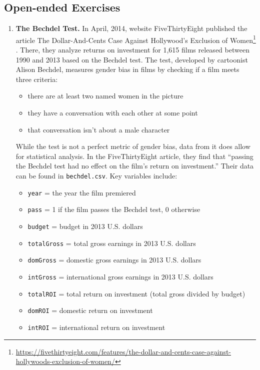 \documentclass[
]{krantz}
\providecommand{\tightlist}{%
  \setlength{\itemsep}{0pt}\setlength{\parskip}{0pt}}
\renewcommand{\href}[2]{#2\footnote{\url{#1}}}
\begin{document}
\hypertarget{open-ended-exercises}{%
\subsection{Open-ended Exercises}\label{open-ended-exercises}}

\begin{enumerate}
\def\labelenumi{\arabic{enumi}.}
\item
  \textbf{The Bechdel Test.} In April, 2014, website FiveThirtyEight published the article \href{https://fivethirtyeight.com/features/the-dollar-and-cents-case-against-hollywoods-exclusion-of-women/}{The Dollar-And-Cents Case Against Hollywood's Exclusion of Women} \citep{Hickey2014}. There, they analyze returns on investment for 1,615 films released between 1990 and 2013 based on the Bechdel test. The test, developed by cartoonist Alison Bechdel, measures gender bias in films by checking if a film meets three criteria:

  \begin{itemize}
  \tightlist
  \item
    there are at least two named women in the picture
  \item
    they have a conversation with each other at some point
  \item
    that conversation isn't about a male character
  \end{itemize}

  While the test is not a perfect metric of gender bias, data from it does allow for statistical analysis. In the FiveThirtyEight article, they find that ``passing the Bechdel test had no effect on the film's return on investment.'' Their data can be found in \texttt{bechdel.csv}. Key variables include:

  \begin{itemize}
  \tightlist
  \item
    \texttt{year} = the year the film premiered
  \item
    \texttt{pass} = 1 if the film passes the Bechdel test, 0 otherwise
  \item
    \texttt{budget} = budget in 2013 U.S. dollars
  \item
    \texttt{totalGross} = total gross earnings in 2013 U.S. dollars
  \item
    \texttt{domGross} = domestic gross earnings in 2013 U.S. dollars
  \item
    \texttt{intGross} = international gross earnings in 2013 U.S. dollars
  \item
    \texttt{totalROI} = total return on investment (total gross divided by budget)
  \item
    \texttt{domROI} = domestic return on investment
  \item
    \texttt{intROI} = international return on investment
  \end{itemize}


\end{enumerate}
\end{document}
